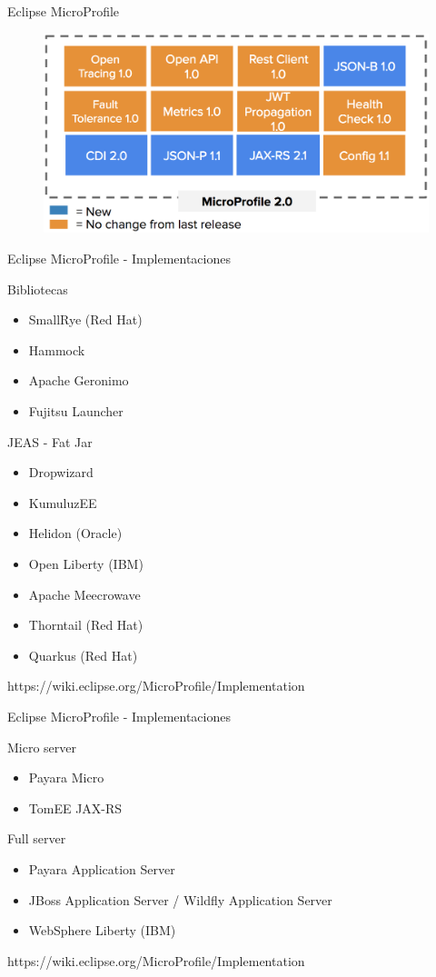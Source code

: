 \documentclass{beamer}
\begin{document}
\begin{frame}{Eclipse MicroProfile}
\begin{figure}
	\centering
	\includegraphics[width=\linewidth]{Images/mp5}
\end{figure}
\end{frame}


\begin{frame}{Eclipse MicroProfile - Implementaciones}

Bibliotecas
\begin{itemize}
	\item SmallRye (Red Hat)
	\item Hammock
	\item Apache Geronimo
	\item Fujitsu Launcher
\end{itemize}
	
JEAS - Fat Jar
\begin{itemize}
	\item Dropwizard
	\item KumuluzEE
	\item Helidon (Oracle)
	\item Open Liberty (IBM)
	\item Apache Meecrowave
	\item Thorntail (Red Hat)
	\item Quarkus (Red Hat)
\end{itemize}

https://wiki.eclipse.org/MicroProfile/Implementation

\end{frame}
\begin{frame}{Eclipse MicroProfile - Implementaciones}

Micro server
\begin{itemize}
	\item Payara Micro
	\item TomEE JAX-RS
\end{itemize}

Full server
\begin{itemize}
	\item Payara Application Server
	\item JBoss Application Server / Wildfly Application Server
	\item WebSphere Liberty (IBM)
\end{itemize}

https://wiki.eclipse.org/MicroProfile/Implementation
\end{frame}
\end{document}

